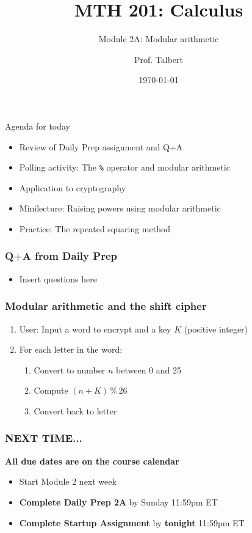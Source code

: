 \documentclass{beamer}
\title{MTH 201: Calculus}
\subtitle{Module 2A: Modular arithmetic}
\author{Prof. Talbert}
\institute{GVSU}
\date{\today}
\begin{document}
\frame{\titlepage}


\begin{frame}{Agenda for today}
    \begin{itemize}
        \item<1-> Review of Daily Prep assignment and Q+A
        \item<2-> Polling activity: The \texttt{\%} operator and modular arithmetic
        \item<3-> Application to cryptography
        \item<4-> Minilecture: Raising powers using modular arithmetic 
        \item<5-> Practice: The repeated squaring method 
    \end{itemize}
\end{frame}

\begin{frame}
    \frametitle{Q+A from Daily Prep}

    \begin{itemize}
        \item Insert questions here 
    \end{itemize}

\end{frame}

\begin{frame}[fragile]
    \frametitle{Modular arithmetic and the shift cipher}



    
    \begin{enumerate}
        \item User: Input a word to encrypt and a key $K$ (positive integer)
        \item For each letter in the word: 
        \begin{enumerate}
            \item Convert to number $n$ between 0 and 25 
            \item Compute $(n + K) \, \% \, 26$
            \item Convert back to letter 
        \end{enumerate}
    \end{enumerate}

\end{frame}



\begin{frame}
    \frametitle{NEXT TIME...}

\begin{center}
    \textbf{All due dates are on the course calendar}
\end{center}

    \begin{itemize}
        \item Start Module 2 next week
        \item \textbf{Complete Daily Prep 2A} by Sunday 11:59pm ET 
        \item \textbf{Complete Startup Assignment} by \textbf{tonight} 11:59pm ET 
    \end{itemize}

\end{frame}
\end{document}
